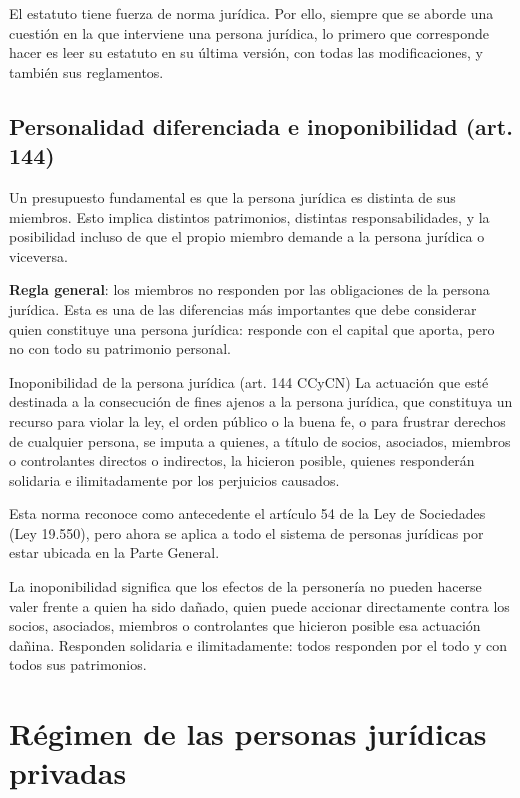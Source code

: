 \documentclass[12pt,oneside]{book}
\begin{document}
El estatuto tiene fuerza de norma jurídica. Por ello, siempre que se aborde una cuestión en la que interviene una persona jurídica, lo primero que corresponde hacer es leer su estatuto en su última versión, con todas las modificaciones, y también sus reglamentos.

\section{Personalidad diferenciada e inoponibilidad (art. 144)}

Un presupuesto fundamental es que la persona jurídica es distinta de sus miembros. Esto implica distintos patrimonios, distintas responsabilidades, y la posibilidad incluso de que el propio miembro demande a la persona jurídica o viceversa.

\begin{important}
\textbf{Regla general}: los miembros no responden por las obligaciones de la persona jurídica. Esta es una de las diferencias más importantes que debe considerar quien constituye una persona jurídica: responde con el capital que aporta, pero no con todo su patrimonio personal.
\end{important}

\begin{definition}{Inoponibilidad de la persona jurídica (art. 144 CCyCN)}
La actuación que esté destinada a la consecución de fines ajenos a la persona jurídica, que constituya un recurso para violar la ley, el orden público o la buena fe, o para frustrar derechos de cualquier persona, se imputa a quienes, a título de socios, asociados, miembros o controlantes directos o indirectos, la hicieron posible, quienes responderán solidaria e ilimitadamente por los perjuicios causados.
\end{definition}

Esta norma reconoce como antecedente el artículo 54 de la Ley de Sociedades (Ley 19.550), pero ahora se aplica a todo el sistema de personas jurídicas por estar ubicada en la Parte General.

La inoponibilidad significa que los efectos de la personería no pueden hacerse valer frente a quien ha sido dañado, quien puede accionar directamente contra los socios, asociados, miembros o controlantes que hicieron posible esa actuación dañina. Responden solidaria e ilimitadamente: todos responden por el todo y con todos sus patrimonios.

\chapter{Régimen de las personas jurídicas privadas}
\end{document}
